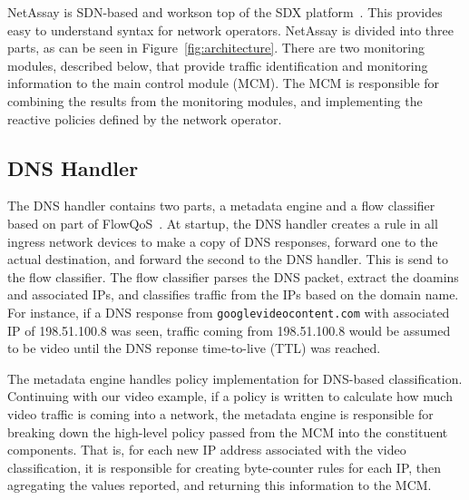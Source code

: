 \documentclass{sig-alternate}
\newcommand\tti[1]{\small\texttt{#1}\normalsize}
\newcommand\system{NetAssay}
\begin{document}
\system{} is SDN-based and workson top of the SDX platform~\cite{sdx}. This provides easy to understand syntax for network operators.
\system{} is divided into three parts, as can be seen in Figure~\ref{fig:architecture}. There are two monitoring modules, described below, that provide traffic identification and monitoring information to the main control module (MCM). %
The MCM is responsible for combining the results from the monitoring modules, and implementing the reactive policies defined by the network operator.

\subsection{DNS Handler}
The DNS handler contains two parts, a metadata engine and a flow classifier based on part of FlowQoS~\cite{FlowQoS}. %
At startup, the DNS handler creates a rule in all ingress network devices to make a copy of DNS responses, forward one to the actual destination, and forward the second to the DNS handler. This is send to the flow classifier. The flow classifier parses the DNS packet, extract the doamins and associated IPs, and classifies traffic from the IPs based on the domain name. For instance, if a DNS response from \tti{googlevideocontent.com} with associated IP of 198.51.100.8 was seen, traffic coming from 198.51.100.8 would be assumed to be video until the DNS reponse time-to-live (TTL) was reached. 

The metadata engine handles policy implementation for DNS-based classification. Continuing with our video example, if a policy is written to calculate how much video traffic is coming into a network, the metadata engine is responsible for breaking down the high-level policy passed from the MCM into the constituent components. That is, for each new IP address associated with the video classification, it is responsible for creating byte-counter rules for each IP, then agregating the values reported, and returning this information to the MCM.

\end{document}

